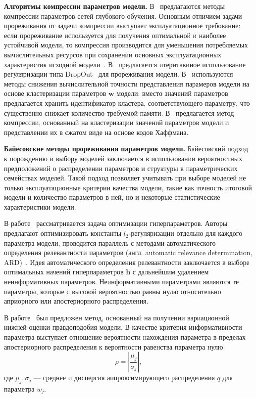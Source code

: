\textbf{Алгоритмы компрессии параметров модели.}
В~\cite{weight_quantization, weight_quantization2,nvidia_prune} предлагаются методы компрессии параметров сетей глубокого обучения. Основным отличием задачи прореживания от задачи компрессии выступает эксплуатационное требование: если прореживание используется для получения оптимальной и наиболее устойчивой модели, то компрессия производится для уменьшения потребляемых вычислительных ресурсов при сохранении основных эксплуатационных характеристик исходной модели~\cite{weight_quantization2}.
В~\cite{nvidia_prune}
предлагается итеритавиное использование регуляризации типа DropOut~\cite{dropout} для прореживания модели. 
В~\cite{weight_quantization, weight_quantization2} используются методы снижения вычислительной точности представления парамеров модели на основе кластеризации параметров $\mathbf{w}$ модели: вместо значений параметров предлагается хранить идентификатор кластера, соответствующего параметру, что существенно снижает количество требуемой памяти.
В~\cite{weight_quantization2} предлагается метод компрессии, основанный на кластеризации значений параметров модели и представлении их в сжатом виде на основе кодов Хаффмана.

\textbf{Байесовские методы прореживания параметров модели. }
Байесовский подход к порождению и выбору моделей заключается в использовании вероятностных предположений о распределении параметров и структуры в параметрических семействах моделей. Такой подход позволяет учитывать при выборе моделей не только эксплуатационные критерии качества модели, такие как точность итоговой модели и количество параметров в ней, но и некоторые статистические характеристики модели. 

В работе~\cite{hyper} рассматривается задача оптимизации гиперпараметров.  Авторы предлагают оптимизировать константы $l_2$-регуляризации отдельно для каждого параметра модели, проводится параллель с методами автоматического определения релевантности параметров (англ. automatic relevance determination, ARD)~\cite{mackay}. 
Идея автоматического определения релевантности заключается в выборе оптимальных начений гиперпараметров $\mathbf{h}$ с дальнейшим удалением неинформативных параметров. Неинформативными параметрами являются те параметры, которые с высокой вероятностью равны нулю относительно априорного или апостериорного распределения.

В работе~\cite{nips} был предложен метод, основанный на получении вариационной нижней оценки правдоподобия модели. В качестве критерия информативности параметра выступает отношение вероятности нахождения параметра в пределах апостериорного распределения к вероятности равенства параметра нулю:
\begin{equation}
\label{eq:rho_graves}
   \rho =  \left|\frac{\mu_j}{\sigma_j}\right|,  
\end{equation}
где $\mu_j, \sigma_j$ --- среднее и дисперсия аппроксимирующего распределения $q$ для параметра $w_j$.


